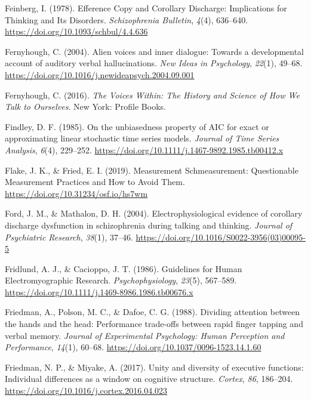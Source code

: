 \documentclass[a4paper,12pt,twoside,openright,oldfontcommands,final]{memoir}
\begin{document}
\leavevmode\hypertarget{ref-feinberg_efference_1978}{}%
Feinberg, I. (1978). Efference Copy and Corollary Discharge: Implications for Thinking and Its Disorders. \emph{Schizophrenia Bulletin}, \emph{4}(4), 636--640. \url{https://doi.org/10.1093/schbul/4.4.636}

\leavevmode\hypertarget{ref-fernyhough_alien_2004}{}%
Fernyhough, C. (2004). Alien voices and inner dialogue: Towards a developmental account of auditory verbal hallucinations. \emph{New Ideas in Psychology}, \emph{22}(1), 49--68. \url{https://doi.org/10.1016/j.newideapsych.2004.09.001}

\leavevmode\hypertarget{ref-fernyhough_voices_2016}{}%
Fernyhough, C. (2016). \emph{The Voices Within: The History and Science of How We Talk to Ourselves}. New York: Profile Books.

\leavevmode\hypertarget{ref-findley_unbiasedness_1985}{}%
Findley, D. F. (1985). On the unbiasedness property of AIC for exact or approximating linear stochastic time series models. \emph{Journal of Time Series Analysis}, \emph{6}(4), 229--252. \url{https://doi.org/10.1111/j.1467-9892.1985.tb00412.x}

\leavevmode\hypertarget{ref-flake_measurement_2019}{}%
Flake, J. K., \& Fried, E. I. (2019). Measurement Schmeasurement: Questionable Measurement Practices and How to Avoid Them. \url{https://doi.org/10.31234/osf.io/hs7wm}

\leavevmode\hypertarget{ref-ford_electrophysiological_2004}{}%
Ford, J. M., \& Mathalon, D. H. (2004). Electrophysiological evidence of corollary discharge dysfunction in schizophrenia during talking and thinking. \emph{Journal of Psychiatric Research}, \emph{38}(1), 37--46. \url{https://doi.org/10.1016/S0022-3956(03)00095-5}

\leavevmode\hypertarget{ref-fridlund_guidelines_1986}{}%
Fridlund, A. J., \& Cacioppo, J. T. (1986). Guidelines for Human Electromyographic Research. \emph{Psychophysiology}, \emph{23}(5), 567--589. \url{https://doi.org/10.1111/j.1469-8986.1986.tb00676.x}

\leavevmode\hypertarget{ref-friedman_dividing_1988}{}%
Friedman, A., Polson, M. C., \& Dafoe, C. G. (1988). Dividing attention between the hands and the head: Performance trade-offs between rapid finger tapping and verbal memory. \emph{Journal of Experimental Psychology: Human Perception and Performance}, \emph{14}(1), 60--68. \url{https://doi.org/10.1037/0096-1523.14.1.60}

\leavevmode\hypertarget{ref-friedman_unity_2017}{}%
Friedman, N. P., \& Miyake, A. (2017). Unity and diversity of executive functions: Individual differences as a window on cognitive structure. \emph{Cortex}, \emph{86}, 186--204. \url{https://doi.org/10.1016/j.cortex.2016.04.023}
\end{document}
